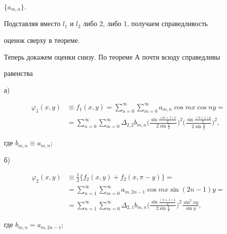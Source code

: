 $\{a_{m,n}\}$. 


 


Подставляя вместо $l_1$ и $l_2$ либо 2, либо 1, получаем справедливость 


оценок сверху в теореме. 


 


Теперь докажем оценки снизу. По теореме А почти всюду справедливы 


равенства 


 


а) 


\begin{align*} 


\varphi_1(x,y)&\equiv f_1(x,y)=\sum^\infty_{n=0} 


\sum^\infty_{m=0}a_{m,n}\cos mx\cos ny =\\ 


% 


&=\sum^\infty_{n=0}\sum^\infty_{m=0}\Delta_{2,2}b_{m,n} 


\biggl(\frac{\sin\frac{(m+1)x}{2}}{2\sin\frac{x}{2}}\biggr)^2 


\biggl(\frac{\sin\frac{(n+1)y}{2}}{2\sin\frac{y}{2}}\biggr)^2, 


\end{align*} 


где $b_{m,n}\equiv a_{m,n}$; 


 


б) 


\begin{align*} 


\varphi_2(x,y)&\equiv\frac{1}{2}\{f_2(x,y)+f_2(x,\pi-y)\}= \\ 


% 


&= \sum^\infty_{n=1}\sum^\infty_{m=0}a_{m,2n-1}\cos mx\sin(2n-1)y= \\ 


% 


&=\sum^\infty_{n=1}\sum^\infty_{m=0}\Delta_{2,1}b_{m,n} 


\biggl(\frac{\sin\frac{(n+1)x}{2}}{2\sin\frac{x}{2}}\biggr)^2 


\frac{\sin^2ny}{\sin y}, 


\end{align*} 


где $b_{m,n}=a_{m,2n-1}$; 


